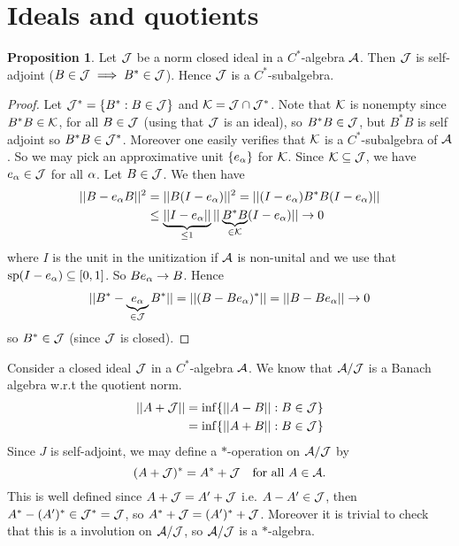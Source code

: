 \documentclass[10pt,english,a4paper]{article}
\theoremstyle{definition}
\newtheorem*{proposition}{Proposition}
\DeclareMathOperator{\Sp}{sp}
\begin{document}
\section{Ideals and quotients}
\begin{proposition}
    Let $\mathcal{J}$ be a norm closed ideal in a $C^*$-algebra $\mathcal{A}$. Then $\mathcal{J}$ is self-adjoint ($B \in \mathcal{J} \implies B^* \in \mathcal{J}$). 
Hence $\mathcal{J}$ is a $C^*$-subalgebra. 
\end{proposition}
\begin{proof}
    Let $\mathcal{J}^* = \{B^* : B \in \mathcal{J}\}$ and $\mathcal{K} = \mathcal{J}\cap \mathcal{J}^*$. Note that 
    $\mathcal{K}$ is nonempty since $B^*B \in \mathcal{K}$, for all $B\in \mathcal{J}$ (using that $\mathcal{J}$ is an ideal),
so $B^*B \in \mathcal{J}$, but $B^*B$ is self adjoint so $B^*B \in \mathcal{J}^*$.
Moreover one easily verifies that $\mathcal{K}$ is a $C^*$-subalgebra of $\mathcal{A}$.
So we may pick an approximative unit $\{e_{\alpha}\}$ for $\mathcal{K}$. Since 
$\mathcal{K} \subseteq \mathcal{J}$, we have $e_{\alpha} \in \mathcal{J}$ for all $\alpha$. Let 
$B \in \mathcal{J}$. We then have 
\begin{align*}
    ||B-e_{\alpha}B||^2 &=
    ||B(I-e_{\alpha})||^2 = ||(I-e_{\alpha}) B^*B (I - e_{\alpha})|| \\
    &\leq \underbrace{||I-e_{\alpha}||}_{\leq 1} ||\underbrace{B^*B}_{\in \mathcal{K}}(I-e_{\alpha})|| \to 0
\end{align*}
where $I$ is the unit in the unitization if $\mathcal{A}$ is non-unital and we use that 
$\Sp(I-e_{\al})\subseteq [0,1]$. So $Be_{\alpha} \to B$.
Hence
\begin{align*}
||B^* - \underbrace{e_{\alpha}}_{\in \mathcal{J}}B^* || = ||(B-Be_{\alpha})^* ||   = ||B-Be_{\alpha}|| \to 0 
\end{align*}
so $B^* \in \mathcal{J}$ (since $\mathcal{J}$ is closed).
\end{proof}


Consider a closed ideal $\mathcal{J}$ in a $C^*$-algebra $\mathcal{A}$. We know that $\mathcal{A}/\mathcal{J}$
is a Banach algebra w.r.t the quotient norm.
\begin{align*}
    ||A+\mathcal{J}|| &= \inf\{ ||A-B|| : B\in \mathcal{J} \} \\
              &= \inf\{ ||A+B|| : B\in \mathcal{J} \}
\end{align*}
Since $J$ is self-adjoint, we may define a $*$-operation on $\mathcal{A}/\mathcal{J}$ by
\[ (A + \mathcal{J})^* = A^* + \mathcal{J} \quad \text{for all } A \in \mathcal{A}.\]
This is well defined since 
$A +\mathcal{J} = A' + \mathcal{J}$ i.e. $A-A' \in \mathcal{J}$, then 
$A^* - (A')^* \in \mathcal{J}^* = \mathcal{J}$, so $A^* + \mathcal{J} = (A')^* + \mathcal{J}$.
Moreover it is trivial to check that this is a involution on 
$\mathcal{A}/\mathcal{J}$, so $\mathcal{A}/\mathcal{J}$ is a $*$-algebra.
\end{document}
